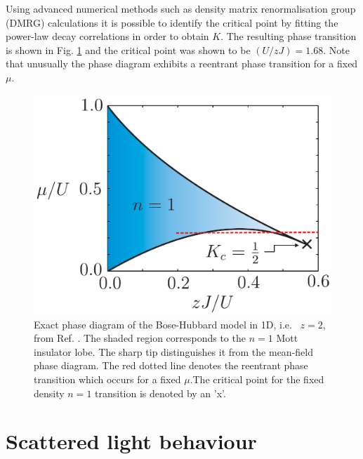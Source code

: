 Using advanced numerical methods such as density matrix
renormalisation group (DMRG) calculations it is possible to identify
the critical point by fitting the power-law decay correlations in
order to obtain $K$. The resulting phase transition is shown in
Fig. \ref{fig:1DPhase} and the critical point was shown to be
$(U/zJ) = 1.68$. Note that unusually the phase diagram exhibits a
reentrant phase transition for a fixed $\mu$.

\begin{figure}
  \centering
  \includegraphics[width=0.8\linewidth]{1DPhase}
  \caption[Exact 1D Bose-Hubbard Phase Diagram]{Exact phase diagram
    of the Bose-Hubbard model in 1D, i.e.~ $z = 2$, from
    Ref. \cite{StephenThesis}. The shaded region corresponds to the
    $n = 1$ Mott insulator lobe. The sharp tip distinguishes it from
    the mean-field phase diagram. The red dotted line denotes the
    reentrant phase transition which occurs for a fixed $\mu$.The
    critical point for the fixed density $n = 1$ transition is denoted
    by an 'x'. \label{fig:1DPhase}}
\end{figure}

\section{Scattered light behaviour}
\label{sec:a}

